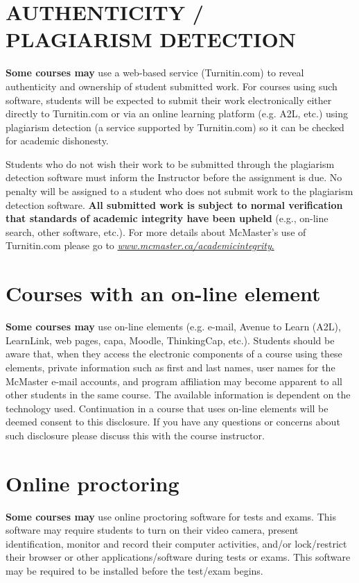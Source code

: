 \documentclass[12pt]{article}
\begin{document}
\begin{center}
\section*{AUTHENTICITY / PLAGIARISM DETECTION}

\textbf{Some courses may} use a web-based service (Turnitin.com)
to reveal authenticity and ownership of student submitted work. For
courses using such software, students will be expected to submit their
work electronically either directly to Turnitin.com or via an online
learning platform (e.g. A2L, etc.) using plagiarism detection (a service
supported by Turnitin.com) so it can be checked for academic dishonesty.

Students who do not wish their work to be submitted through the
plagiarism detection software must inform the Instructor before the
assignment is due. No penalty will be assigned to a student who does not
submit work to the plagiarism detection software. \textbf{All submitted
work is subject to normal verification that standards of academic
integrity have been upheld} (e.g., on-line search, other software,
etc.). For more details about McMaster's use of Turnitin.com please go
to
\href{http://www.mcmaster.ca/academicintegrity}{\emph{www.mcmaster.ca/academicintegrity}.}

\section*{Courses with an on-line element}

\textbf{Some courses may} use on-line elements (e.g. e-mail,
Avenue to Learn (A2L), LearnLink, web pages, capa, Moodle, ThinkingCap,
etc.). Students should be aware that, when they access the electronic
components of a course using these elements, private information such as
first and last names, user names for the McMaster e-mail accounts, and
program affiliation may become apparent to all other students in the
same course. The available information is dependent on the technology
used. Continuation in a course that uses on-line elements will be deemed
consent to this disclosure. If you have any questions or concerns about
such disclosure please discuss this with the course instructor.

\section*{Online proctoring}

\textbf{Some courses may} use online proctoring software for tests and
exams. This software may require students to turn on their video camera,
present identification, monitor and record their computer activities,
and/or lock/restrict their browser or other applications/software during
tests or exams. This software may be required to be installed before the
test/exam begins.


\end{center}
\end{document}
